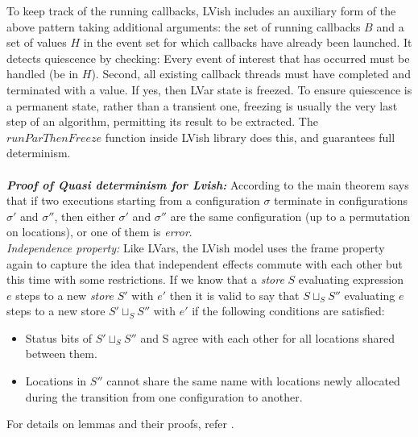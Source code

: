 \documentclass[twocolumn]{article}
\begin{document}
To keep track of the running callbacks, LVish includes an auxiliary form of the above pattern taking additional arguments: the set of running callbacks $B$ and a set of values $H$ in the event set for which callbacks have already been launched. It detects quiescence by checking: Every event of interest that has occurred must be handled (be in $H$). Second, all existing callback threads must have completed and terminated with a value. If yes, then LVar state is freezed. To ensure quiescence is a permanent state, rather than a transient one, freezing is usually the very last step of an algorithm, permitting its result to be extracted. The $runParThenFreeze$ function inside LVish library does this, and guarantees full determinism.\\ \\
\textbf{\textit{Proof of Quasi determinism for Lvish:}} According to \cite{lkuper2} the main theorem says that if two executions starting from a configuration $\sigma$ terminate in configurations $\sigma{'}$ and $\sigma{''}$, then either $\sigma{'}$ and $\sigma{''}$ are the same configuration (up to a permutation on locations), or one of them is \emph{error}.\\
\textit{Independence property:} Like LVars, the LVish model uses the frame property again to capture the idea that independent effects commute with each other but this time with some restrictions. If we know that a \emph{store} $S$ evaluating expression $e$ steps to a new \emph{store} $S{'}$ with $e{'}$ then it is valid to say that $S\sqcup_{S}S''$ evaluating $e$ steps to a new store $S'\sqcup_{S}S''$ with $e'$ if the following conditions are satisfied:
\begin{itemize}
\item Status bits of $S'\sqcup_{S}S''$ and S agree with each other for all locations shared between them.
\item Locations in $S''$ cannot share the same name with locations newly allocated during the transition from one configuration
to another.
\end{itemize}
For details on lemmas and their proofs, refer \cite{kuper}\cite{lkuper2}.
\end{document}

